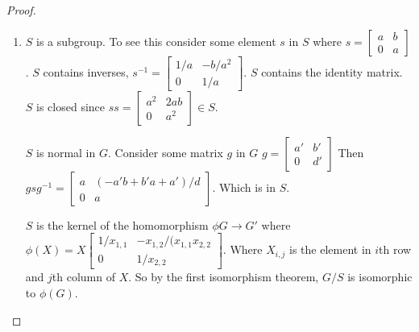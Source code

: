 \documentclass[12pt]{article}
\begin{document}
\begin{proof}
\begin{enumerate}
        \item $S$ is a subgroup. To see this consider some element $s$
            in $S$ where 
            $ s= 
                \left[
                    \begin{array}{cc}
                        a & b \\
                        0 & a
                    \end{array}
                \right]$. 
            $S$ contains inverses, $s^{-1} =
                \left[
                    \begin{array}{cc}
                        1/a & -b/a^2 \\
                        0   & 1/a
                    \end{array}
                \right]$. 
            $S$ contains the identity matrix. $S$ is closed since
            $ ss = 
                \left[
                    \begin{array}{cc}
                        a^2 & 2ab \\
                        0 & a^2
                    \end{array}
                \right] \in S$.

            $S$ is normal in $G$. Consider some matrix $g$ in $G$ 
            $g = \left[
            \begin{array}{cc}
                a' & b' \\
                0 & d'
            \end{array}
            \right]$
            Then $gsg^{-1} = \left[
            \begin{array}{cc}
                a & (-a'b + b'a + a')/d \\
                0 & a
            \end{array}
            \right]$. Which is in $S$.

            $S$ is the kernel of the homomorphism $\phi G \rightarrow G'$
            where $\phi(X) = X\left[
            \begin{array}{cc}
                1/x_{1,1} & - x_{1,2}/(x_{1,1} x_{2,2} \\
                0 & 1/x_{2,2}
            \end{array}
            \right]$. Where $X_{i,j}$ is the element in $i$th row and
            $j$th column of $X$. So by the first isomorphism theorem,
            $G/S$ is isomorphic to $\phi(G)$.

    \end{enumerate}
\end{proof}
\end{document}
